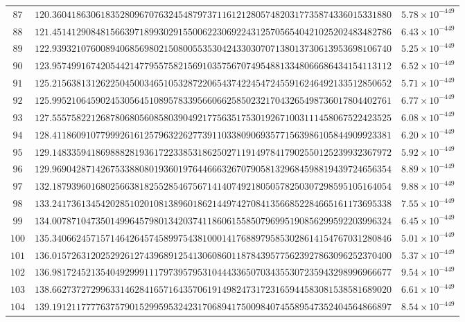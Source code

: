 \documentclass[12pt,reqno]{amsart}
\theoremstyle{remark}
\begin{document}
\begin{longtable}{clc}
$87$ & $120.3604186306183528096707632454879737116121280574820317735874336015331880$ & $5.78\times 10^{-449}$ \\
$88$ & $121.4514129084815663971899302915500622306922431257056540421025202483482786$ & $6.43\times 10^{-449}$ \\
$89$ & $122.9393210760089406856980215080055353042433030707138013730613953698106740$ & $5.25\times 10^{-449}$ \\
$90$ & $123.9574991674205442147795575821569103575670749548813348066686434154113112$ & $6.52\times 10^{-449}$ \\
$91$ & $125.2156381312622504500346510532872206543742245472455916246492133512850652$ & $5.71\times 10^{-449}$ \\
$92$ & $125.9952106459024530564510895783395660662585023217043265498736017804402761$ & $6.77\times 10^{-449}$ \\
$93$ & $127.5557582212687806805608580390492177563517530192671003111458067522423525$ & $6.08\times 10^{-449}$ \\
$94$ & $128.4118609107799926161257963226277391103380906935771563986105844909923381$ & $6.20\times 10^{-449}$ \\
$95$ & $129.1483359418698882819361722338531862502711914978417902550125239932367972$ & $5.92\times 10^{-449}$ \\
$96$ & $129.9690428714267533880801936019764466632670790581329684598819439724656354$ & $8.89\times 10^{-449}$ \\
$97$ & $132.1879396016802566381825528546756714140749218050578250307298595105164054$ & $9.88\times 10^{-449}$ \\
$98$ & $133.2417361345420285102010813896018621449742708413566852284665161173695338$ & $7.55\times 10^{-449}$ \\
$99$ & $134.0078710473501499645798013420374118606155850796995190856299592203996324$ & $6.45\times 10^{-449}$ \\
$100$ & $135.3406624571571464264574589975438100014176889795853028614154767031280846$ & $5.01\times 10^{-449}$ \\
$101$ & $136.0157263120252926127439689125413060860118784395775623927863096252370400$ & $5.37\times 10^{-449}$ \\
$102$ & $136.9817245213540492999111797395795310444336507034355307235943298996966677$ & $9.54\times 10^{-449}$ \\
$103$ & $138.6627372729963314628416571643570619149824731723165944583081538581689020$ & $6.61\times 10^{-449}$ \\
$104$ & $139.1912117777637579015299595324231706894175009840745589547352404564866897$ & $8.54\times 10^{-449}$ \\

\end{longtable}
\end{document}
